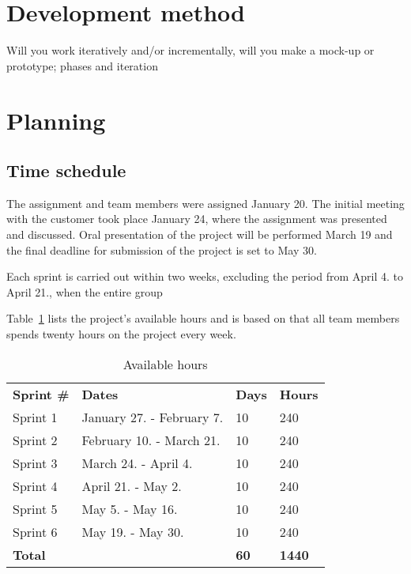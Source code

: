 \section{Development method}
Will you work iteratively and/or incrementally, will you make a 
mock-up or prototype; phases and iteration

\section{Planning}
\subsection{Time schedule}
The assignment and team members were assigned January 20. The initial meeting with the customer took place January 24, where the assignment was presented and discussed. Oral presentation of the project will be performed March 19 and the final deadline for submission of the project is set to May 30.

Each sprint is carried out within two weeks, excluding the period from April 4. to April 21., when the entire group 
 
 Table~\ref{tab:availHours} lists the project's available hours and is based on  that all team members spends twenty hours on the project every week.

\begin{table}[H]
\centering
{}
\begin{tabular}{|l|l|l|l|}
\hline
\textbf{Sprint \#} & \textbf{Dates} & \textbf{Days} & \textbf{Hours}\\
Sprint 1& January 27. - February 7. & 10  & 240 \\
Sprint 2 & February 10. - March 21. &10  & 240 \\
Sprint 3 & March 24. - April 4. &10 & 240 \\
Sprint 4 & April 21. - May 2. &10  &240 \\
Sprint 5 & May 5. - May 16. &10&  240 \\
Sprint 6 & May 19. - May 30. &10  &240 \\
\textbf{Total}&& \textbf{60}&  \textbf{1440}\\\hline
\end{tabular}
\caption{Available hours}
\label{tab:availHours}
\end{table}

